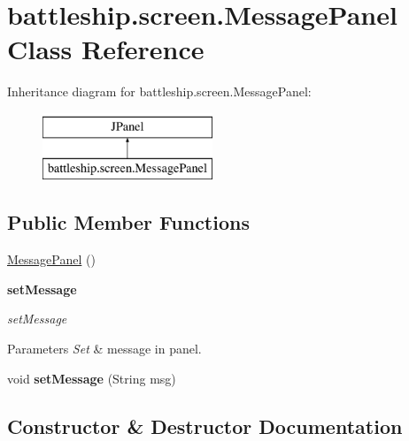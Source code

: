\hypertarget{classbattleship_1_1screen_1_1MessagePanel}{}\section{battleship.\+screen.\+Message\+Panel Class Reference}
\label{classbattleship_1_1screen_1_1MessagePanel}
Inheritance diagram for battleship.\+screen.\+Message\+Panel\+:\begin{figure}[H]
\begin{center}
\leavevmode
\includegraphics[height=2.000000cm]{classbattleship_1_1screen_1_1MessagePanel}
\end{center}
\end{figure}
\subsection*{Public Member Functions}
\begin{DoxyCompactItemize}
\item 
\hyperlink{classbattleship_1_1screen_1_1MessagePanel_aaabb4486ad3d1d23d6c5590df1ab724c}{Message\+Panel} ()
\end{DoxyCompactItemize}
\begin{Indent}{\bf set\+Message}\par
{\em set\+Message


\begin{DoxyParams}{Parameters}
{\em Set} & message in panel. \\
\hline
\end{DoxyParams}
}\begin{DoxyCompactItemize}
\item 
\hypertarget{classbattleship_1_1screen_1_1MessagePanel_a211bbaf3ac2677c12a7cdedf59a07464}{}void {\bfseries set\+Message} (String msg)\label{classbattleship_1_1screen_1_1MessagePanel_a211bbaf3ac2677c12a7cdedf59a07464}

\end{DoxyCompactItemize}
\end{Indent}


\subsection{Constructor \& Destructor Documentation}
\hypertarget{classbattleship_1_1screen_1_1MessagePanel_aaabb4486ad3d1d23d6c5590df1ab724c}{}
